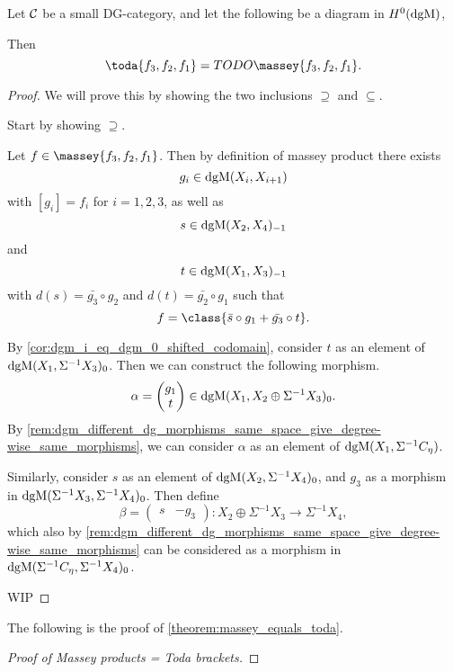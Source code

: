 \begin{lemma}
    Let \( {\mathcal{C}} \) be a small DG-category, and let the following be a diagram in \( H^0(\operatorname{dgM}) \),
    \begin{center}
    \end{center}
    Then
    \[
        \toda{f_3, f_2, f_1} = TODO\massey{f_3, f_2, f_1}.
    \]
\end{lemma}
\begin{proof}
    We will prove this by showing the two inclusions \( \supseteq \) and \( \subseteq \).

    Start by showing \( \supseteq \).

    Let \( f \in \massey{f_3, f_2, f_1} \). Then by definition of massey product there exists
    \[
        g_i \in \operatorname{dgM}(X_i, X_{i + 1})
    \]
    with \( [g_i] = f_i \) for \( i = 1, 2, 3 \), as well as
    \[
        s \in \operatorname{dgM}(X_2, X_4)_{-1}
    \]
    and
    \[
        t \in \operatorname{dgM}(X_1, X_3)_{-1}
    \]
    with \( d(s) = \bar{g_3} \circ g_2 \) and \( d(t) = \bar{g_2} \circ g_1 \) such that
    \[
        f = \class{\bar{s} \circ g_1 + \bar{g_3} \circ t}.
    \]

    By \autoref{cor:dgm_i_eq_dgm_0_shifted_codomain}, consider \( t \) as an element of \( \operatorname{dgM}(X_1, \Sigma^{-1} X_3)_0 \). Then we can construct the following morphism.
    \[
        \alpha =
        \begin{pmatrix}
            g_1 \\
            t
        \end{pmatrix}
        \in \operatorname{dgM}(X_1, X_2 \oplus \Sigma^{-1} X_3)_0.
    \]
    By \autoref{rem:dgm_different_dg_morphisms_same_space_give_degree-wise_same_morphisms}, we can consider \( \alpha \) as an element of \( \operatorname{dgM}(X_1, \Sigma^{-1} C_{\eta}) \).

    Similarly, consider \( s \) as an element of \( \operatorname{dgM}(X_2, \Sigma^{-1} X_4)_0 \), and \( g_3 \) as a morphism in \( \operatorname{dgM}(\Sigma^{-1} X_3, \Sigma^{-1} X_4)_0 \). Then define
    \[
        \beta =
        \begin{pmatrix}
            s & -g_3
        \end{pmatrix}
        : X_2 \oplus \Sigma^{-1} X_3 \to \Sigma^{-1} X_4,
    \]
    which also by \autoref{rem:dgm_different_dg_morphisms_same_space_give_degree-wise_same_morphisms} can be considered as a morphism in \( \operatorname{dgM}(\Sigma^{-1} C_{\eta}, \Sigma^{-1} X_4)_0 \).

    WIP
\end{proof}

The following is the proof of \autoref{theorem:massey_equals_toda}.

\begin{proof}[Proof of Massey products = Toda brackets]
    
\end{proof}